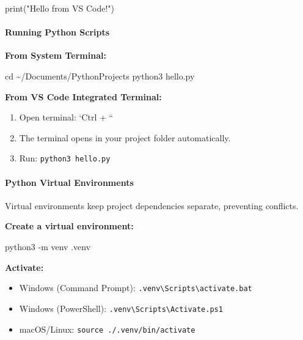 \documentclass[
  justified,
  openright,
]{tufte-book}
\let\subsection\paragraph
\let\paragraph\paragraph
\newcommand{\StringTok}[1]{\textcolor{CodeString}{#1}}              %
\newcommand{\CodeTypeTok}[1]{\textcolor{CodeType}{#1}}              %
\newenvironment{Shaded}{%
  \begin{mdframed}[style=TufteCode]%
}{%
  \end{mdframed}%
}
\let\subsection\paragraph
\let\paragraph\paragraph
\providecommand{\tightlist}{%
  \setlength{\itemsep}{0pt}\setlength{\parskip}{0pt}}
\begin{document}
\begin{Shaded}
\begin{Highlighting}[]
print(\StringTok{"Hello from VS Code!"})
\end{Highlighting}
\end{Shaded}

\subsection{Running Python Scripts}\label{running-python-scripts}

\textbf{From System Terminal:}

\begin{Shaded}
\begin{Highlighting}[]
cd \textasciitilde{}/Documents/PythonProjects
python3 hello.py
\end{Highlighting}
\end{Shaded}

\textbf{From VS Code Integrated Terminal:}

\begin{enumerate}
\def\labelenumi{\arabic{enumi}.}
\tightlist
\item
  Open terminal: `Ctrl + ``
\item
  The terminal opens in your project folder automatically.
\item
  Run: \texttt{python3\ hello.py}
\end{enumerate}

\subsection{Python Virtual
Environments}\label{python-virtual-environments}

Virtual environments keep project dependencies separate, preventing
conflicts.

\textbf{Create a virtual environment:}

\begin{Shaded}
\begin{Highlighting}[]
python3 \CodeTypeTok{{-}m} venv .venv
\end{Highlighting}
\end{Shaded}

\textbf{Activate:}

\begin{itemize}
\tightlist
\item
  Windows (Command Prompt):
  \texttt{.venv\textbackslash{}Scripts\textbackslash{}activate.bat}
\item
  Windows (PowerShell):
  \texttt{.venv\textbackslash{}Scripts\textbackslash{}Activate.ps1}
\item
  macOS/Linux: \texttt{source\ ./.venv/bin/activate}
\end{itemize}
\end{document}
